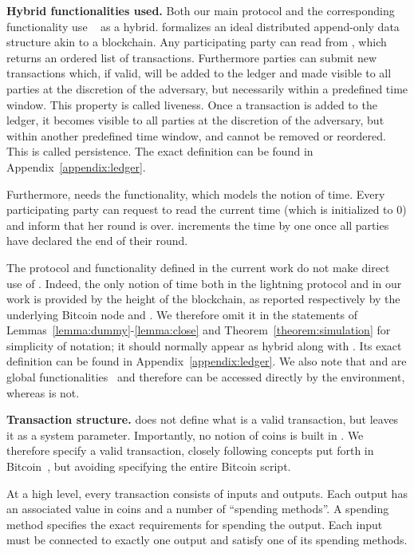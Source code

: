   \noindent \textbf{Hybrid functionalities used.}
    Both our main protocol and the corresponding functionality use
    \ledger~\cite{BMTZ17,genesis} as a hybrid. \ledger{} formalizes an ideal
    distributed append-only data structure akin to a blockchain. Any
    participating party can read from \ledger, which returns an ordered list
    of transactions. Furthermore parties can submit new transactions which, if
    valid, will be added to the ledger and made visible to all parties at the
    discretion of the adversary, but necessarily within a predefined time
    window. This property is called liveness. Once a transaction is added to the
    ledger, it becomes visible to all parties at the discretion of the
    adversary, but within another predefined time window, and cannot be removed
    or reordered. This is called persistence. The exact definition can be found
    in Appendix~\ref{appendix:ledger}.

    Furthermore, \ledger{} needs the \Fclock functionality, which models the
    notion of time. Every participating party can request to read the current
    time (which is initialized to 0) and inform \Fclock that her round is over.
    \Fclock increments the time by one once all parties have declared the end of
    their round.

    The protocol and functionality defined in the current work do not make
    direct use of \Fclock. Indeed, the only notion of time both in the lightning
    protocol and in our work is provided by the height of the blockchain, as
    reported respectively by the underlying Bitcoin node and \ledger. We
    therefore omit it in the statements of
    Lemmas~\ref{lemma:dummy}-\ref{lemma:close} and
    Theorem~\ref{theorem:simulation} for simplicity of notation; it should
    normally appear as hybrid along with \ledger. Its exact definition can be
    found in Appendix~\ref{appendix:ledger}. We also note that \ledger{} and
    \Fclock are global functionalities~\cite{globaluc} and therefore can be
    accessed directly by the environment, whereas \fpaynet{} is not.

  \noindent \textbf{Transaction structure.}
    \ledger{} does not define what is a valid transaction, but leaves it as a
    system parameter. Importantly, no notion of coins is built in \ledger. We
    therefore specify a valid transaction, closely following concepts put forth
    in Bitcoin~\cite{bitcoin}, but avoiding specifying the entire Bitcoin
    script.

    At a high level, every transaction consists of inputs and outputs. Each
    output has an associated value in coins and a number of ``spending
    methods''. A spending method specifies the exact requirements for spending
    the output. Each input must be connected to exactly one output and satisfy
    one of its spending methods.

